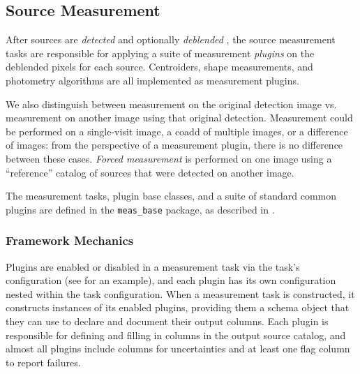 \subsection{Source Measurement}
\label{sec:measurement}

After sources are \emph{detected}  and optionally \emph{deblended} , the source measurement tasks are responsible for applying a suite of measurement \emph{plugins} on the deblended pixels for each source.
Centroiders, shape measurements, and photometry algorithms are all implemented as measurement plugins.

We also distinguish between measurement on the original detection image vs. measurement on another image using that original detection.
Measurement could be performed on a single-visit image, a coadd of multiple images, or a difference of images: from the perspective of a measurement plugin, there is no difference between these cases.
\textit{Forced measurement} is performed on one image using a ``reference'' catalog of sources that were detected on another image.

The measurement tasks, plugin base classes, and a suite of standard common plugins are defined in the \texttt{meas\_base} package, as described in .

\subsubsection{Framework Mechanics}
\label{sec:measurement-interfaces}

Plugins are enabled or disabled in a measurement task via the task's configuration (see  for an example), and each plugin has its own configuration nested within the task configuration.
When a measurement task is constructed, it constructs instances of its enabled plugins, providing them a schema object that they can use to declare and document their output columns.
Each plugin is responsible for defining and filling in columns in the output source catalog, and almost all plugins include columns for uncertainties and at least one flag column to report failures.

